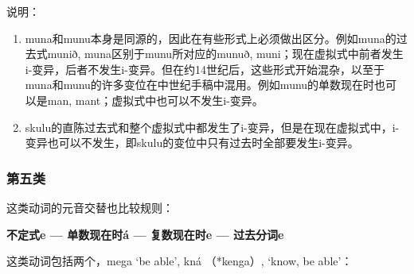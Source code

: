 
说明：

\begin{enumerate}
    \item
          muna和munu本身是同源的，因此在有些形式上必须做出区分。例如muna的过去式munið,
          muna区别于munu所对应的munuð,
          muni；现在虚拟式中前者发生i-变异，后者不发生i-变异。但在约14世纪后，这些形式开始混杂，以至于muna和munu的许多变位在中世纪手稿中混用。例如munu的单数现在时也可以是man,
          mant；虚拟式中也可以不发生i-变异。
    \item
          skulu的直陈过去式和整个虚拟式中都发生了i-变异，但是在现在虚拟式中，i-变异也可以不发生，即skulu的变位中只有过去时全部要发生i-变异。
\end{enumerate}

\subsubsection{第五类}

这类动词的元音交替也比较规则：

\begin{center}
    \textbf{不定式e --- 单数现在时á --- 复数现在时e --- 过去分词e}
\end{center}

这类动词包括两个，mega `be able‌', kná （*kenga）, `know, be able‌'：

